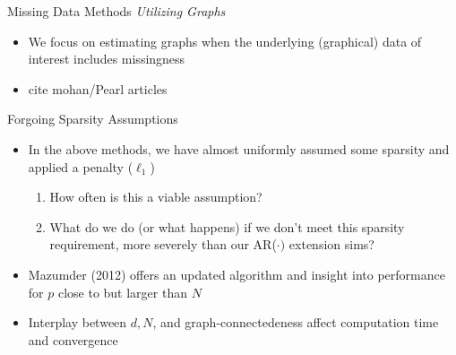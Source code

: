 \documentclass{beamer}
\begin{document}
\begin{frame}{Missing Data Methods {\it Utilizing Graphs}}
    \begin{itemize}
        \item We focus on estimating graphs when the underlying (graphical) data of interest includes missingness 
        \item cite mohan/Pearl articles
    \end{itemize}
\end{frame}
    
\begin{frame}{Forgoing Sparsity Assumptions}
\begin{itemize}
\item In the above methods, we have almost uniformly assumed some sparsity and applied a penalty ($\ell_1$)
    \begin{enumerate}
        \item How often is this a viable assumption? 
        \item What do we do (or what happens) if we don't meet this sparsity requirement, more severely than our AR($\cdot)$ extension sims?  
    \end{enumerate}
\item     Mazumder (2012) \cite{mazumder_graphical_2012} offers an updated algorithm and insight into performance for $p$ close to but larger than $N$
\item Interplay between $d, N$, and graph-connectedeness affect computation time and convergence 
\end{itemize}
\end{frame}
\end{document}
